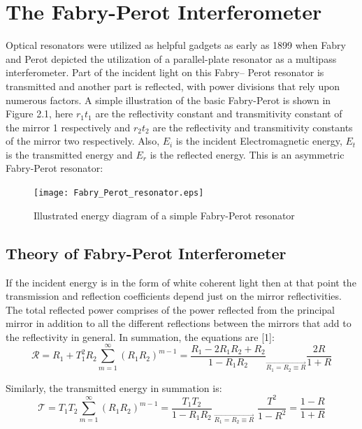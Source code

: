 \section{The Fabry-Perot Interferometer}
Optical resonators were utilized as helpful gadgets as early as 1899 when Fabry and Perot depicted the utilization of a parallel-plate resonator as a multipass interferometer. Part of the incident light on this Fabry– Perot resonator is transmitted and another part is reflected, with power divisions that rely upon numerous factors. A simple illustration of the basic Fabry-Perot is shown in Figure 2.1, here $r_{1} t_{1}$ are the reflectivity constant and transmitivity constant of the mirror 1 respectively and $r_{2} t_{2}$ are the reflectivity and transmitivity constants of the mirror two respectively. Also, $E_{i}$ is the incident Electromagnetic energy, $E_{t}$ is the transmitted energy and $E_{r}$ is the reflected energy. This is an asymmetric Fabry-Perot resonator:

\begin{figure}[h]
\centering
\texttt{[image: Fabry\_Perot\_resonator.eps]}
\caption{Illustrated energy diagram of a simple Fabry-Perot resonator}
\end{figure}



\newpage

\subsection{Theory of Fabry-Perot Interferometer}
If the incident energy is in the form of white coherent light then at that point the transmission and reflection coefficients depend just on the mirror reflectivities. The total reflected power comprises of the power reflected from the principal mirror in addition to all the different reflections between the mirrors that add to the reflectivity in general. In summation, the equations are [1]: 
\begin{equation}
{\mathcal R} = R_{1} + T_{1}^2 R_{2} \sum_{m=1}^{\infty} (R_{1}R_{2})^{m-1} = \frac{R_{1} - 2R_{1}R_{2} + R_{2}}{1 - R_{1}R_{2}} _{\overrightarrow{R_{1} = R_{2} \equiv R}} \frac{2R}{1+R}
\end{equation}

Similarly, the transmitted energy in summation is:
\begin{equation}
{\mathcal T} = T_{1} T_{2} \sum_{m=1}^{\infty} (R_{1}R_{2})^{m-1} = \frac{T_{1} T_{2}}{1 - R_{1}R_{2}} _{\; \overrightarrow{R_{1} = R_{2} \equiv R}} \; \frac{T^{2}}{1-R^{2}} = \frac{1-R}{1+R}
\end{equation}

